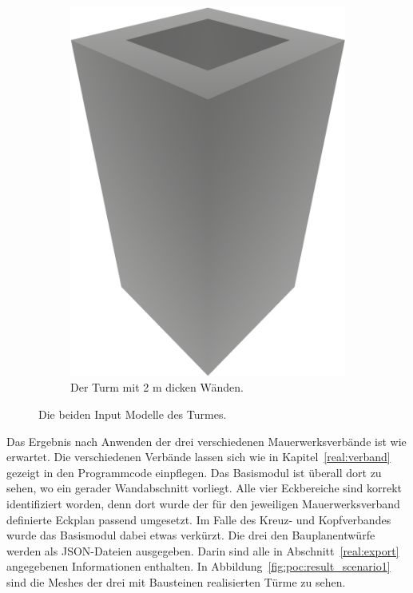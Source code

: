 \begin{figure}[ht!]
\begin{subfigure}[b]{0.3\columnwidth}
    \includegraphics[width=\columnwidth]{fig/render_base_thick.png}
    \caption{Der Turm mit 2 m dicken Wänden.}\label{fig:poc:render_laeuferverband50}
  \end{subfigure}
  \hspace*{\fill}%
  \caption{Die beiden Input Modelle des Turmes.}\label{fig:poc:scenario1 modell}
\end{figure}

Das Ergebnis nach Anwenden der drei verschiedenen Mauerwerksverbände ist wie erwartet.
Die verschiedenen Verbände lassen sich wie in Kapitel~\ref{real:verband} gezeigt in den Programmcode einpflegen.
Das Basismodul ist überall dort zu sehen, wo ein gerader Wandabschnitt vorliegt.
Alle vier Eckbereiche sind korrekt identifiziert worden, denn dort wurde der für den jeweiligen Mauerwerksverband definierte Eckplan passend umgesetzt.
Im Falle des Kreuz- und Kopfverbandes wurde das Basismodul dabei etwas verkürzt.
Die drei den Bauplanentwürfe werden als JSON-Dateien ausgegeben.
Darin sind alle in Abschnitt~\ref{real:export} angegebenen Informationen enthalten.
In Abbildung~\ref{fig:poc:result_scenario1} sind die Meshes der drei mit Bausteinen realisierten Türme zu sehen.

